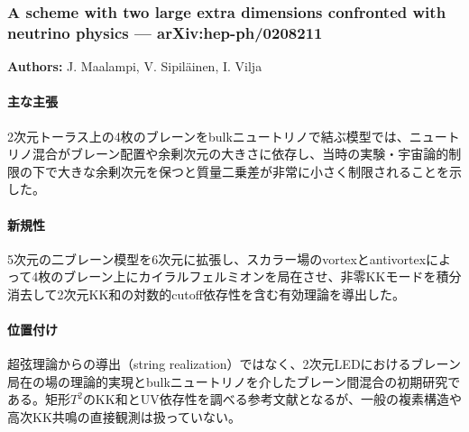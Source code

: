 \subsubsection{A scheme with two large extra dimensions confronted with neutrino physics --- arXiv:hep-ph/0208211}

\textbf{Authors:} J. Maalampi, V. Sipil\"ainen, I. Vilja

\paragraph{主な主張}
2次元トーラス上の4枚のブレーンをbulkニュートリノで結ぶ模型では、ニュートリノ混合がブレーン配置や余剰次元の大きさに依存し、当時の実験・宇宙論的制限の下で大きな余剰次元を保つと質量二乗差が非常に小さく制限されることを示した\cite{Maalampi:2002Torus}。

\paragraph{新規性}
5次元の二ブレーン模型を6次元に拡張し、スカラー場のvortexとantivortexによって4枚のブレーン上にカイラルフェルミオンを局在させ、非零KKモードを積分消去して2次元KK和の対数的cutoff依存性を含む有効理論を導出した。

\paragraph{位置付け}
超弦理論からの導出（string realization）ではなく、2次元LEDにおけるブレーン局在の場の理論的実現とbulkニュートリノを介したブレーン間混合の初期研究である。矩形$T^2$のKK和とUV依存性を調べる参考文献となるが、一般の複素構造や高次KK共鳴の直接観測は扱っていない。
